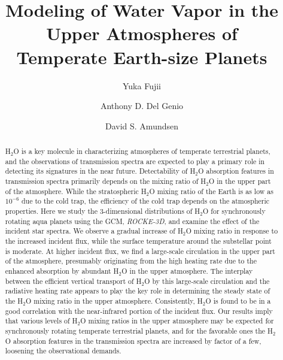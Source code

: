 \documentclass[11pt,numberedappendix,twocolappendix,]{emulateapj}
\def\water{H$_2$O }
\def\modelE{{\it ROCKE-3D}}
\begin{document}
\title{Modeling of Water Vapor in the Upper Atmospheres of 
\\Temperate Earth-size Planets}
\author{Yuka Fujii}
\author{Anthony D. Del Genio}
\author{David S. Amundsen}

\begin{abstract}

\water is a key molecule in characterizing atmospheres of temperate terrestrial planets, and the observations of transmission spectra are expected to play a primary role in detecting its signatures in the near future. 
%
Detectability of \water absorption features in transmission spectra primarily depends on the mixing ratio of \water in the upper part of the atmosphere. 
%
While the stratospheric \water mixing ratio of the Earth is as low as $10^{-6}$ due to the cold trap, the efficiency of the cold trap depends on the atmospheric properties. 
%
Here we study the 3-dimensional distributions of \water for synchronously rotating aqua planets using the GCM, \modelE, and examine the effect of the incident star spectra. 
%
We observe a gradual increase of \water mixing ratio in response to the increased incident flux, while the surface temperature around the substellar point is moderate. 
%
At higher incident flux, we find a large-scale circulation in the upper part of the atmosphere, presumably originating from the high heating rate due to the enhanced absorption by abundant \water in the upper atmosphere. 
%
The interplay between the efficient vertical transport of \water by this large-scale circulation and the radiative heating rate appears to play the key role in determining the steady state of the \water mixing ratio in the upper atmosphere.  
%
Consistently, \water is found to be in a good correlation with the near-infrared portion of the incident flux. 
%
Our results imply that various levels of \water mixing ratios in the upper atmosphere may be expected for synchronously rotating temperate terrestrial planets, and for the favorable ones the \water absorption features in the transmission spectra are increased by factor of a few, loosening the observational demands. 
%
\end{abstract}
\end{document}
